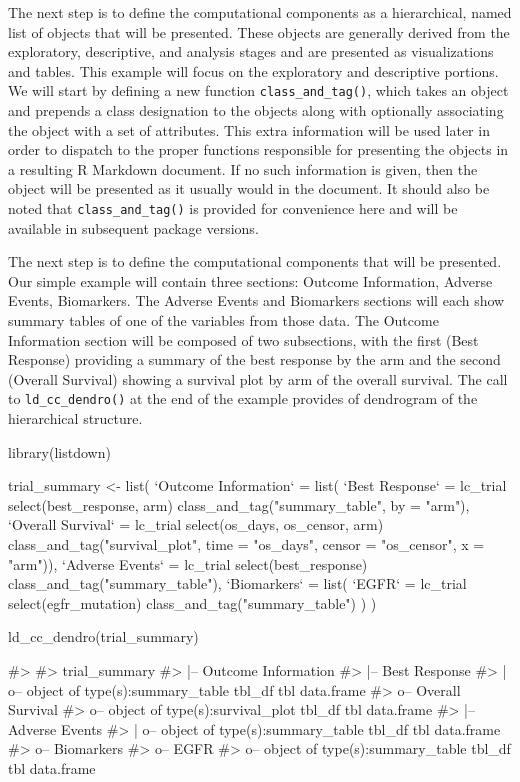 The next step is to define the computational components as a
hierarchical, named list of objects that will be presented. These
objects are generally derived from the exploratory, descriptive, and
analysis stages and are presented as visualizations and tables. This
example will focus on the exploratory and descriptive portions. We will
start by defining a new function \texttt{class\_and\_tag()}, which takes
an object and prepends a class designation to the objects along with
optionally associating the object with a set of attributes. This extra
information will be used later in order to dispatch to the proper
functions responsible for presenting the objects in a resulting R
Markdown document. If no such information is given, then the object will
be presented as it usually would in the document. It should also be
noted that \texttt{class\_and\_tag()} is provided for convenience here
and will be available in subsequent package versions.

The next step is to define the computational components that will be
presented. Our simple example will contain three sections: Outcome
Information, Adverse Events, Biomarkers. The Adverse Events and
Biomarkers sections will each show summary tables of one of the
variables from those data. The Outcome Information section will be
composed of two subsections, with the first (Best Response) providing a
summary of the best response by the arm and the second (Overall
Survival) showing a survival plot by arm of the overall survival. The
call to \texttt{ld\_cc\_dendro()} at the end of the example provides of
dendrogram of the hierarchical structure.

\begin{Schunk}
\begin{Sinput}
library(listdown)

trial_summary <- list(
  `Outcome Information` = list(
    `Best Response` = lc_trial %
      select(best_response, arm) %
      class_and_tag("summary_table", by = "arm"),
    `Overall Survival` = lc_trial %
      select(os_days, os_censor, arm) %
      class_and_tag("survival_plot", 
                    time = "os_days", 
                    censor = "os_censor", 
                    x = "arm")),
  `Adverse Events` = lc_trial %
    select(best_response) %
    class_and_tag("summary_table"),
  `Biomarkers` = list(
    `EGFR` = lc_trial %
      select(egfr_mutation) %
      class_and_tag("summary_table")
  )
)

ld_cc_dendro(trial_summary)
\end{Sinput}
\begin{Soutput}
#> 
#> trial_summary
#>   |-- Outcome Information
#>    |-- Best Response
#>    |  o-- object of type(s):summary_table tbl_df tbl data.frame
#>    o-- Overall Survival
#>       o-- object of type(s):survival_plot tbl_df tbl data.frame
#>   |-- Adverse Events
#>   |  o-- object of type(s):summary_table tbl_df tbl data.frame
#>   o-- Biomarkers
#>    o-- EGFR
#>       o-- object of type(s):summary_table tbl_df tbl data.frame
\end{Soutput}
\end{Schunk}

